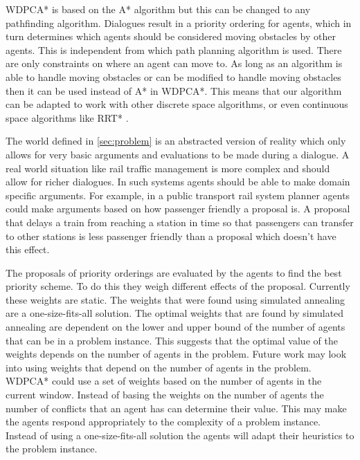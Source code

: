 WDPCA* is based on the A* algorithm \citep{hart1968} but this can be changed to
any pathfinding algorithm. Dialogues result in a priority ordering for agents,
which in turn determines which agents should be considered moving obstacles by
other agents. This is independent from which path planning algorithm is used.
There are only constraints on where an agent can move to. As long as an
algorithm
is able to handle moving obstacles or can be modified to handle moving
obstacles then it can be used instead of A* in WDPCA*. This means that our
algorithm can be adapted to work with other discrete space algorithms, or even
continuous space algorithms like RRT* \citep{lavalle1998,lavalle2001}.

The world defined in \autoref{sec:problem} is an abstracted version of reality
which only allows for very basic arguments and evaluations to be made during a
dialogue. A real world situation like rail traffic management is more complex
and should allow for richer dialogues. In such systems agents should be able to
make domain specific arguments. For example, in a public transport rail system
planner agents could make arguments based on how passenger friendly a proposal
is. A proposal that delays a train from reaching a station in time so that
passengers can transfer to other stations is less passenger friendly than a
proposal which doesn't have this effect.

The proposals of priority orderings are evaluated by the agents to find the
best priority scheme. To do this they weigh different effects of the proposal.
Currently these weights are static. The weights that were found using simulated
annealing are a one-size-fits-all solution. The optimal weights that are found
by simulated annealing are dependent on the lower and upper bound of the number
of agents that can be in a problem instance. This suggests that the optimal
value of the weights depends on the number of agents in the problem. Future
work may look into using weights that depend on the number of agents in the
problem. WDPCA* could use a set of weights based on the number of agents in the
current window. Instead of basing the weights on the number of agents the
number of conflicts that an agent has can determine their value. This may make
the agents respond appropriately to the complexity of a problem instance.
Instead of using a one-size-fits-all solution the agents will adapt their
heuristics to the problem instance.


